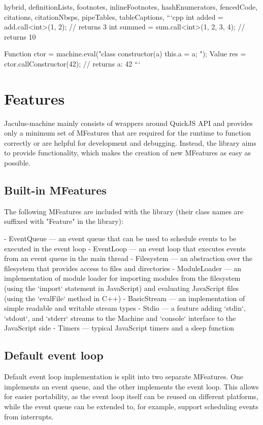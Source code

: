 \begin{markdown*}{%
  hybrid,
  definitionLists,
  footnotes,
  inlineFootnotes,
  hashEnumerators,
  fencedCode,
  citations,
  citationNbsps,
  pipeTables,
  tableCaptions,
}
```cpp
int added = add.call<int>(1, 2);  // returns 3
int summed = sum.call<int>(1, 2, 3, 4);  // returns 10

Function ctor = machine.eval("class { constructor(a) { this.a = a; } }");
Value res = ctor.callConstructor(42);  // returns { a: 42 }
```


\section{Features}

Jaculus-machine mainly consists of wrappers around QuickJS API and provides only a minimum set of MFeatures that are required for the runtime to function correctly or are helpful for development and debugging. Instead, the library aims to provide functionality, which makes the creation of new MFeatures as easy as possible.

\subsection{Built-in MFeatures}

The following MFeatures are included with the library (their class names are suffixed with "Feature" in the library):

  - EventQueue --- an event queue that can be used to schedule events to be executed in the event loop
  - EventLoop --- an event loop that executes events from an event queue in the main thread
  - Filesystem --- an abstraction over the filesystem that provides access to files and directories
  - ModuleLoader --- an implementation of module loader for importing modules from the filesystem (using the `import` statement in JavaScript) and evaluating JavaScript files (using the `evalFile` method in C++)
  - BasicStream --- an implementation of simple readable and writable stream types
  - Stdio --- a feature adding `stdin`, `stdout`, and `stderr` streams to the Machine and `console` interface to the JavaScript side
  - Timers --- typical JavaScript timers and a sleep function

\subsection{Default event loop}

Default event loop implementation is split into two separate MFeatures. One implements an event queue, and the other implements the event loop. This allows for easier portability, as the event loop itself can be reused on different platforms, while the event queue can be extended to, for example, support scheduling events from interrupts.


\end{markdown*}
